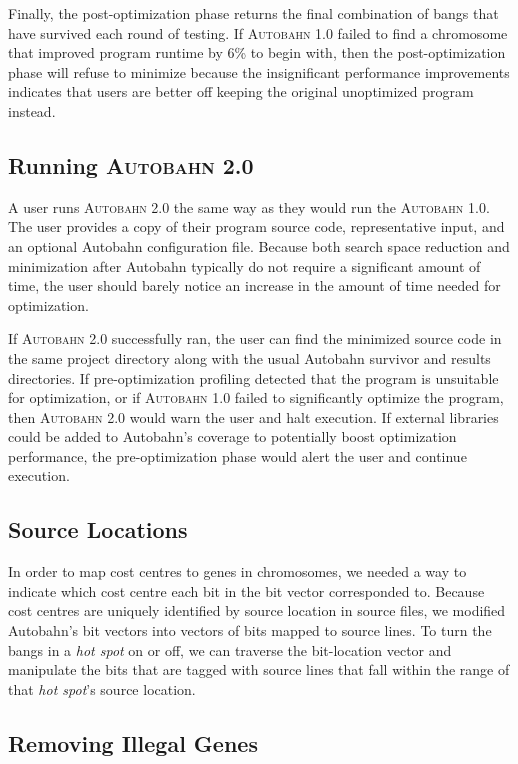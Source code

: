 \documentclass[format=sigplan]{acmart}
\newcommand{\hotspot}[0]{\textit{hot spot}}
\newcommand{\Ao}[0]{\textsc{Autobahn 1.0}}
\newcommand{\At}[0]{\textsc{Autobahn 2.0}}
\newcommand{\preopt}[0]{pre-optimization}
\newcommand{\postopt}[0]{post-optimization}
\begin{document}
Finally, the \postopt{} phase returns the final combination of bangs that have survived each round of testing. If \Ao{} failed to find a chromosome that improved program runtime by 6\% to begin with, then the \postopt{} phase will refuse to minimize because the insignificant performance improvements indicates that users are better off keeping the original unoptimized program instead.


\subsection{Running \At{}}

A user runs \At{} the same way as they would run the \Ao{}. The user provides a copy of their program source code, representative input, and an optional Autobahn configuration file. Because both search space reduction and minimization after Autobahn typically do not require a significant amount of time, the user should barely notice an increase in the amount of time needed for optimization. 

If \At{} successfully ran, the user can find the minimized source code in the same project directory along with the usual Autobahn survivor and results directories. If \preopt{} profiling detected that the program is unsuitable for optimization, or if \Ao{} failed to significantly optimize the program, then \At{} would warn the user and halt execution. If external libraries could be added to Autobahn's coverage to potentially boost optimization performance, the \preopt{} phase would alert the user and continue execution.

\subsection{Source Locations}

In order to map cost centres to genes in chromosomes, we needed a way to indicate which cost centre each bit in the bit vector corresponded to. Because cost centres are uniquely identified by source location in source files, we modified Autobahn's bit vectors into vectors of bits mapped to source lines. To turn the bangs in a \hotspot{} on or off, we can traverse the bit-location vector and manipulate the bits that are tagged with source lines that fall within the range of that \hotspot{}'s source location.

\subsection{Removing Illegal Genes}
\end{document}
